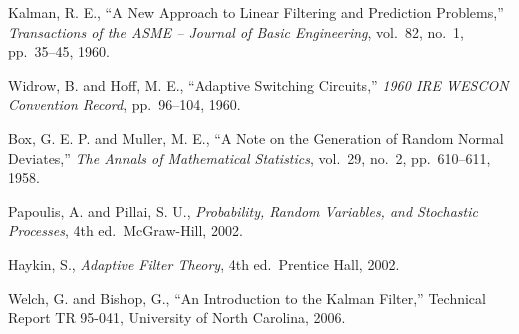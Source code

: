 \documentclass[12pt, a4paper]{article}
\begin{document}
\begin{enumerate}[label={[\arabic*]}]
  \item Kalman, R. E., ``A New Approach to Linear Filtering and Prediction Problems,''
        \textit{Transactions of the ASME -- Journal of Basic Engineering},
        vol.~82, no.~1, pp.~35--45, 1960.

  \item Widrow, B. and Hoff, M. E., ``Adaptive Switching Circuits,''
        \textit{1960 IRE WESCON Convention Record}, pp.~96--104, 1960.

  \item Box, G. E. P. and Muller, M. E., ``A Note on the Generation of Random Normal
        Deviates,'' \textit{The Annals of Mathematical Statistics},
        vol.~29, no.~2, pp.~610--611, 1958.

  \item Papoulis, A. and Pillai, S. U., \textit{Probability, Random Variables, and
        Stochastic Processes}, 4th ed.\ McGraw-Hill, 2002.

  \item Haykin, S., \textit{Adaptive Filter Theory}, 4th ed.\ Prentice Hall, 2002.

  \item Welch, G. and Bishop, G., ``An Introduction to the Kalman Filter,''
        Technical Report TR 95-041, University of North Carolina, 2006.
\end{enumerate}
\end{document}
